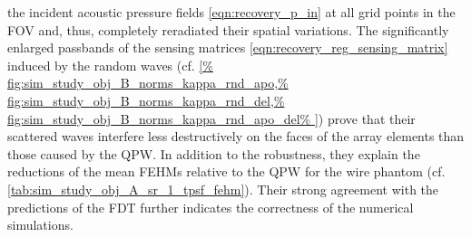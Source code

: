 the incident acoustic pressure fields
\eqref{eqn:recovery_p_in} at
all grid points in
the \ac{FOV} and, thus, completely reradiated
their spatial variations.
The significantly enlarged passbands of
the sensing matrices
\eqref{eqn:recovery_reg_sensing_matrix} induced by
the random waves
(cf. \cref{%
  fig:sim_study_obj_B_norms_kappa_rnd_apo,%
  fig:sim_study_obj_B_norms_kappa_rnd_del,%
  fig:sim_study_obj_B_norms_kappa_rnd_apo_del%
}) prove that
their scattered waves interfere
less destructively on
the faces of
the array elements than
those caused by
the \ac{QPW}.
In addition to
the robustness, they explain
the reductions of
the mean \acp{FEHM} relative to
the \ac{QPW} for
the wire phantom
(cf. \cref{tab:sim_study_obj_A_sr_1_tpsf_fehm}).
Their strong agreement with
the predictions of
the \ac{FDT} further indicates
the correctness of
the numerical simulations.
